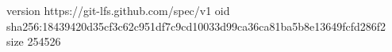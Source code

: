 version https://git-lfs.github.com/spec/v1
oid sha256:18439420d35cf3c62c951df7c9cd10033d99ca36ca81ba5b8e13649fcfd286f2
size 254526
